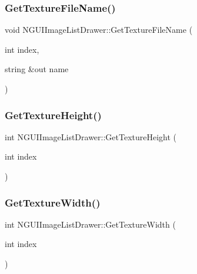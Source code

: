 \subsubsection{\texorpdfstring{Get\+Texture\+File\+Name()}{GetTextureFileName()}}
{\footnotesize\ttfamily void N\+G\+U\+I\+Image\+List\+Drawer\+::\+Get\+Texture\+File\+Name (\begin{DoxyParamCaption}\item[{int}]{index,  }\item[{string \&out}]{name }\end{DoxyParamCaption})}

\hypertarget{class_n_g_u_i_image_list_drawer_a6a3f5b4bfed073661addc60cfd50490d}{}\label{class_n_g_u_i_image_list_drawer_a6a3f5b4bfed073661addc60cfd50490d} 
\subsubsection{\texorpdfstring{Get\+Texture\+Height()}{GetTextureHeight()}}
{\footnotesize\ttfamily int N\+G\+U\+I\+Image\+List\+Drawer\+::\+Get\+Texture\+Height (\begin{DoxyParamCaption}\item[{int}]{index }\end{DoxyParamCaption})}

\hypertarget{class_n_g_u_i_image_list_drawer_a3fddaf69ac3017ced58ceafae46c378d}{}\label{class_n_g_u_i_image_list_drawer_a3fddaf69ac3017ced58ceafae46c378d} 
\subsubsection{\texorpdfstring{Get\+Texture\+Width()}{GetTextureWidth()}}
{\footnotesize\ttfamily int N\+G\+U\+I\+Image\+List\+Drawer\+::\+Get\+Texture\+Width (\begin{DoxyParamCaption}\item[{int}]{index }\end{DoxyParamCaption})}

\hypertarget{class_n_g_u_i_image_list_drawer_a976094ccc570619569b83f2803d4e47f}{}\label{class_n_g_u_i_image_list_drawer_a976094ccc570619569b83f2803d4e47f} 
